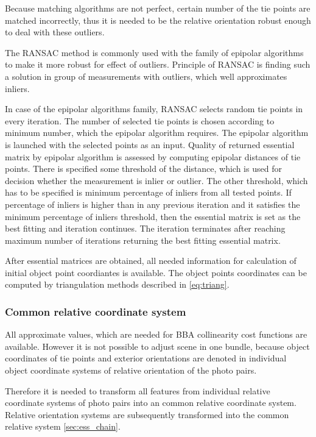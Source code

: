 \documentclass[a4paper,12pt]{article}
\begin{document}
Because matching algorithms are not perfect, certain number of the tie points are matched 
incorrectly, thus it is needed to be the relative orientation robust enough to
deal with these outliers.

The RANSAC \cite{wiki:RANSAC} method is commonly used with the family of epipolar algorithms to 
make it more robust for effect of outliers.
Principle of RANSAC is finding such  a solution in group of measurements with outliers, 
which well approximates inliers.  

In case of the epipolar algorithms family, RANSAC selects random tie points in every iteration.
The number of selected tie points is chosen according to minimum number, which the epipolar algorithm requires.
The epipolar algorithm is launched with the selected points as an input. 
Quality of returned essential matrix by epipolar algorithm is assessed by 
computing epipolar distances of tie points. There is specified some threshold of the distance, which is used 
for decision whether the measurement is inlier or outlier. The other threshold, which has to be specified 
is minimum percentage of inliers from all tested points. If percentage of inliers is higher than in any previous iteration
and it satisfies the minimum percentage of inliers threshold, then
the essential matrix is set as the best fitting and iteration continues. The iteration terminates after 
reaching maximum number of iterations returning the best fitting essential matrix.

After essential matrices are obtained, all needed information for calculation of initial object point coordiantes
is  available. The object points coordinates can be computed by triangulation methods described in \ref{eq:triang}.


\subsubsection{Common relative coordinate system}

All approximate values, which are needed for BBA collinearity cost functions are available. 
However it is not possible to adjust scene in one bundle, because
object coordinates of tie points and exterior orientations are denoted in  individual object coordinate systems
of relative orientation of the photo pairs.

Therefore it is needed to transform all features from individual relative coordinate systems of photo pairs into 
an common relative coordinate system.
Relative orientation systems are subsequently transformed into the common relative system \ref{sec:ess_chain}. 
\end{document}

